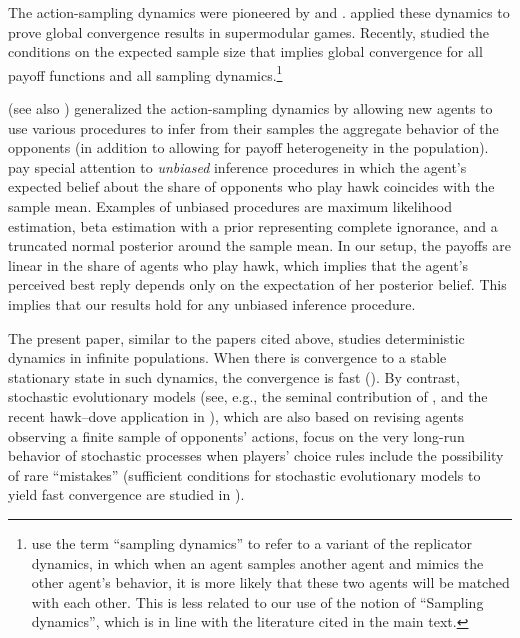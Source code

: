 \documentclass[12pt]{article}
\numberwithin{equation}{section}
\numberwithin{figure}{section}
\theoremstyle{definition}
\theoremstyle{plain}
\theoremstyle{plain}
\theoremstyle{plain}
\theoremstyle{remark}
\theoremstyle{plain}
\theoremstyle{plain}
\begin{document}
The action-sampling dynamics were pioneered by 
  \cite{sandholm2001almost} and \cite{osborne2003sampling}. \cite{oyama2015sampling} applied these dynamics to prove global convergence results in supermodular games. Recently, \cite{heller2018social} studied the conditions on the expected sample size 
    that implies global convergence for all payoff functions and all sampling dynamics.\footnote{   \cite{hauert2018effects} use the term ``sampling dynamics'' to refer to a variant  of the replicator dynamics, in which when an agent samples another agent and mimics the other agent's behavior, it is more likely that these two agents will be matched with each other. This is less related to our use of the notion of ``Sampling dynamics'', which is in line with the literature cited in the main text.}

  
  \cite{salant2020statistical} (see also \citealp{sawa2021statistical}) generalized the action-sampling dynamics by allowing new agents to use various procedures to infer from their samples the aggregate behavior of the opponents 
  (in addition to allowing for payoff heterogeneity in the population).  \citeauthor{salant2020statistical} pay special attention to \emph{unbiased} inference procedures in which the agent's expected belief about the share of opponents who play hawk coincides with the sample mean. Examples of unbiased procedures are maximum likelihood estimation, beta estimation with a prior representing complete ignorance, and a truncated normal posterior around the sample mean. In our setup, the payoffs are linear in the share of agents who play hawk, which implies that the agent's perceived best reply depends only on the expectation of her posterior belief. This implies that our results hold for any unbiased inference procedure.
  
  The present paper, similar to the papers cited above, studies deterministic dynamics in infinite populations. When there is convergence to a stable stationary state in such dynamics, the convergence is fast
  (\citealp{oyama2015sampling}).
  By contrast, stochastic evolutionary models (see, e.g., the seminal contribution of \citealp{young1993evolution}, 
  and the recent hawk--dove application in \citealp{Bilancini-et-al-2021}), which are also based on revising agents observing a finite sample of opponents' actions,  focus on the very long-run behavior of stochastic processes when players’ choice rules include the possibility of rare “mistakes” 
  (sufficient conditions for stochastic evolutionary models to yield fast convergence are studied in \citealp{kreindler2013fast,arieli2020speed}).
 
\end{document}
